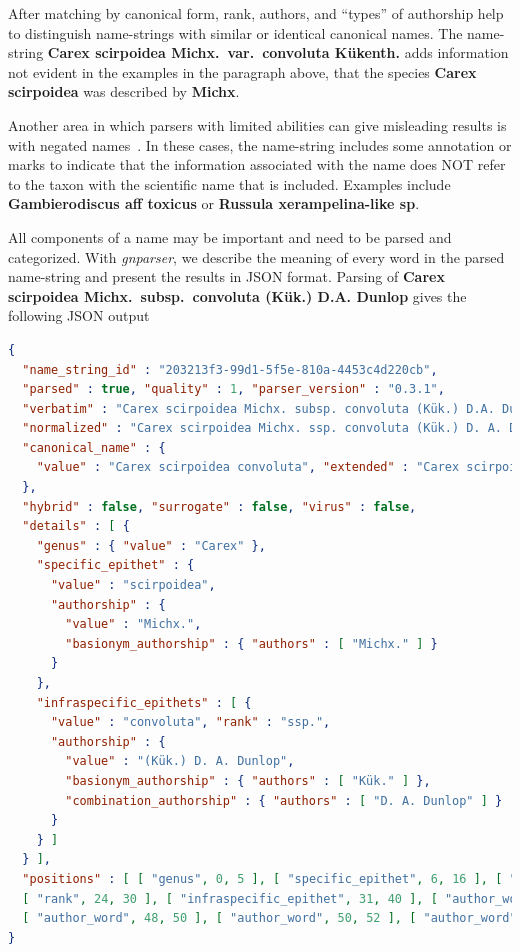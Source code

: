 \documentclass{bmcart}
\begin{document}
After matching by canonical form, rank, authors, and ``types'' of authorship help to distinguish name-strings with similar or identical canonical names. The name-string \textbf{Carex scirpoidea Michx.\ var.\ convoluta Kükenth.} adds  information not evident in the examples in the paragraph above, that the species \textbf{Carex scirpoidea} was described by \textbf{Michx}.

Another area in which parsers with limited abilities can give misleading results is with negated names~\cite{Patterson2016}. In these cases, the name-string includes some annotation or marks to indicate that the information associated with the name does NOT refer to the taxon with the scientific name that is included. Examples include \textbf{Gambierodiscus aff toxicus} or \textbf{Russula xerampelina-like sp}.

All components of a name may be important and need to be parsed and categorized. With \textit{gnparser}, we describe the meaning of every word in the parsed name-string and present the results in JSON format. Parsing of \textbf{Carex scirpoidea Michx.\ subsp.\ convoluta (Kük.) D.A. Dunlop} gives the following JSON output

\vspace{0.1cm}

\begin{lstlisting}[language=json]
{
  "name_string_id" : "203213f3-99d1-5f5e-810a-4453c4d220cb",
  "parsed" : true, "quality" : 1, "parser_version" : "0.3.1",
  "verbatim" : "Carex scirpoidea Michx. subsp. convoluta (Kük.) D.A. Dunlop",
  "normalized" : "Carex scirpoidea Michx. ssp. convoluta (Kük.) D. A. Dunlop",
  "canonical_name" : {
    "value" : "Carex scirpoidea convoluta", "extended" : "Carex scirpoidea ssp. convoluta"
  },
  "hybrid" : false, "surrogate" : false, "virus" : false,
  "details" : [ {
    "genus" : { "value" : "Carex" },
    "specific_epithet" : {
      "value" : "scirpoidea",
      "authorship" : {
        "value" : "Michx.",
        "basionym_authorship" : { "authors" : [ "Michx." ] }
      }
    },
    "infraspecific_epithets" : [ {
      "value" : "convoluta", "rank" : "ssp.",
      "authorship" : {
        "value" : "(Kük.) D. A. Dunlop",
        "basionym_authorship" : { "authors" : [ "Kük." ] },
        "combination_authorship" : { "authors" : [ "D. A. Dunlop" ] }
      }
    } ]
  } ],
  "positions" : [ [ "genus", 0, 5 ], [ "specific_epithet", 6, 16 ], [ "author_word", 17, 23 ],
  [ "rank", 24, 30 ], [ "infraspecific_epithet", 31, 40 ], [ "author_word", 42, 46 ],
  [ "author_word", 48, 50 ], [ "author_word", 50, 52 ], [ "author_word", 53, 59 ] ]
}
\end{lstlisting}
\end{document}
